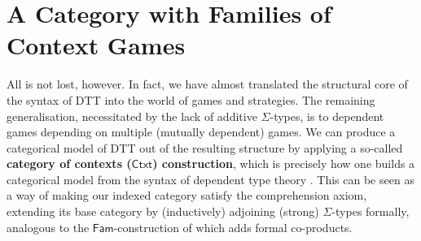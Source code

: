 \documentclass[runningheads,a4paper]{llncs}
\renewcommand{\emph}[1]{\textbf{#1}}
\begin{document}
\vspace{-8pt}
\section{A Category with Families of Context Games}\vspace{-7pt} \label{sec:ctxt}
All is not lost, however. In fact, we have almost translated the structural core of the syntax of \textsf{DTT} into the world of games and strategies. The remaining generalisation, necessitated by the lack of additive $\Sigma$-types, is to dependent games depending on multiple (mutually dependent) games. We can produce a categorical model of \textsf{DTT} out of the resulting structure by applying a so-called \emph{category of contexts ($\mathsf{Ctxt}$) construction}, which is precisely how one builds a categorical model from the syntax of dependent type theory \cite{hofmann1997syntax,pitts1995categorical}. This can be seen as a way of making our indexed category satisfy the comprehension axiom, extending its base category by (inductively) adjoining (strong) $\Sigma$-types formally, analogous to the $\mathsf{Fam}$-construction of \cite{abramsky1998cbvgames} which adds formal co-products.
\end{document}
